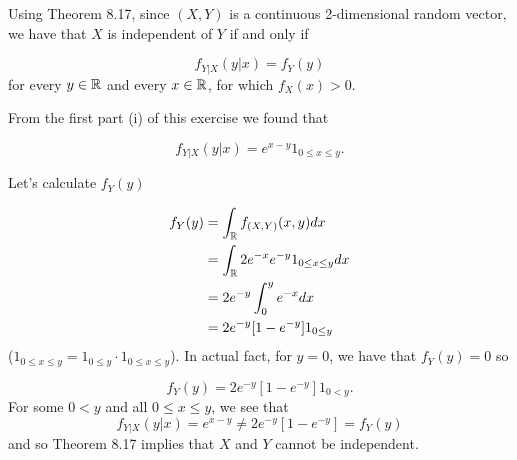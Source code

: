
Using Theorem 8.17, since $ (X,Y)$ is a continuous 2-dimensional random vector, we have that $ X$ is
independent of $ Y$ if and only if 

\[
    f_{Y|X} (y|x) = f_{Y} (y)
\] 
for every $ y \in \mathbb{R} $ and every $ x \in \mathbb{R}$, for which $ f_{X} (x) > 0$.

From the first part (i) of this exercise we found that 

\[
    f_{Y|X} (y|x) = e^{x-y} 1_{0 \leq x \leq y} 
.\] 


Let's calculate $ f_{Y} (y)$ 

\begin{align*}
    f_{Y} (y) &= \int_{\mathbb{R}} f_{(X,Y)} (x,y) dx \\
	      &= \int_{\mathbb{R}} 2e^{-x} e^{-y} 1_{0 \leq x \leq y} dx  \\
	      &= 2 e^{-y} \int_{0}^{y} e^{-x} dx\\
	      &= 2 e^{-y} [1 - e^{-y}]1_{0 \leq y}  
\end{align*}
($ 1_{0 \leq x \leq y} = 1_{0 \leq y} \cdot 1_{0 \leq x \leq y} $). In actual fact, for $ y =0$, we
have that $ f_{Y} (y) = 0$ so 

\[
    f_{Y} (y) = 2e^{-y} [1-e^{-y} ] 1_{0 < y} 
.\] 
For some $ 0 < y$ and all $ 0 \leq x \leq y $, we see that 
\[
    f_{Y|X} (y|x) = e^{x-y} \neq 2 e^{-y} [1-e^{-y} ] = f_{Y} (y) 
\] 
and so Theorem 8.17 implies that $ X$ and $ Y$ cannot be independent.


